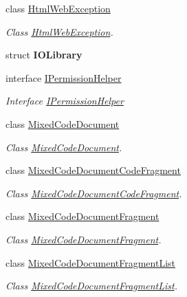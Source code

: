 \begin{DoxyCompactItemize}
class \hyperlink{class_html_agility_pack_1_1_html_web_exception}{Html\+Web\+Exception}
\begin{DoxyCompactList}\small\item\em Class \hyperlink{class_html_agility_pack_1_1_html_web_exception}{Html\+Web\+Exception}. \end{DoxyCompactList}\item 
struct {\bfseries I\+O\+Library}
\item 
interface \hyperlink{interface_html_agility_pack_1_1_i_permission_helper}{I\+Permission\+Helper}
\begin{DoxyCompactList}\small\item\em Interface \hyperlink{interface_html_agility_pack_1_1_i_permission_helper}{I\+Permission\+Helper} \end{DoxyCompactList}\item 
class \hyperlink{class_html_agility_pack_1_1_mixed_code_document}{Mixed\+Code\+Document}
\begin{DoxyCompactList}\small\item\em Class \hyperlink{class_html_agility_pack_1_1_mixed_code_document}{Mixed\+Code\+Document}. \end{DoxyCompactList}\item 
class \hyperlink{class_html_agility_pack_1_1_mixed_code_document_code_fragment}{Mixed\+Code\+Document\+Code\+Fragment}
\begin{DoxyCompactList}\small\item\em Class \hyperlink{class_html_agility_pack_1_1_mixed_code_document_code_fragment}{Mixed\+Code\+Document\+Code\+Fragment}. \end{DoxyCompactList}\item 
class \hyperlink{class_html_agility_pack_1_1_mixed_code_document_fragment}{Mixed\+Code\+Document\+Fragment}
\begin{DoxyCompactList}\small\item\em Class \hyperlink{class_html_agility_pack_1_1_mixed_code_document_fragment}{Mixed\+Code\+Document\+Fragment}. \end{DoxyCompactList}\item 
class \hyperlink{class_html_agility_pack_1_1_mixed_code_document_fragment_list}{Mixed\+Code\+Document\+Fragment\+List}
\begin{DoxyCompactList}\small\item\em Class \hyperlink{class_html_agility_pack_1_1_mixed_code_document_fragment_list}{Mixed\+Code\+Document\+Fragment\+List}. \end{DoxyCompactList}\item 

\end{DoxyCompactItemize}
